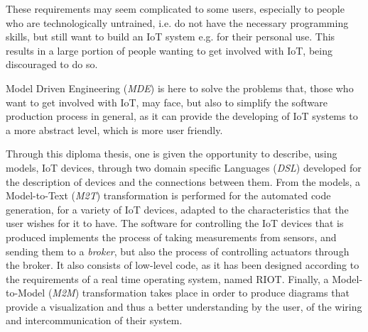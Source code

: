 These requirements may seem complicated to some users, especially to people who are technologically untrained, i.e. do not have the necessary programming skills, but still want to build an IoT system e.g. for their personal use. This results in a large portion of people wanting to get involved with IoT, being discouraged to do so.

Model Driven Engineering (\textit{MDE}) is here to solve the problems that, those who want to get involved with IoT, may face, but also to simplify the software production process in general, as it can provide the developing of IoT systems to a more abstract level, which is more user friendly.

Through this diploma thesis, one is given the opportunity to describe, using models, IoT devices, through two domain specific Languages (\textit{DSL}) developed for the description of devices and the connections between them. From the models, a Model-to-Text (\textit{M2T}) transformation is performed for the automated code generation, for a variety of IoT devices, adapted to the characteristics that the user wishes for it to have. The software for controlling the IoT devices that is produced implements the process of taking measurements from sensors, and sending them to a \textit{broker}, but also the process of controlling actuators through the broker. It also consists of low-level code, as it has been designed according to the requirements of a real time operating system, named RIOT. Finally, a Model-to-Model (\textit{M2M}) transformation takes place in order to produce diagrams that provide a visualization and thus a better understanding by the user, of the wiring and intercommunication of their system.